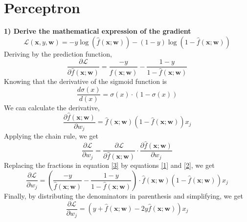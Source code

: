 \documentclass[acmconf,nonacm=true]{acmart}
\begin{document}
\section{Perceptron}
\textbf{1) Derive the mathematical expression of the gradient}
$$
\mathcal{L}(\mathbf{x}, y, \mathbf{w})=-y \log (\hat{f}(\mathbf{x} ; \mathbf{w}))-(1-y) \log (1-\hat{f}(\mathbf{x} ; \mathbf{w}))
$$
Deriving by the prediction function,
\begin{equation*} \label{1}
    \frac{\partial \mathcal{L}}{\partial \hat{f}(\mathbf{x} ; \mathbf{w})}=\frac{-y}{\hat{f}(\mathbf{x} ; \mathbf{w})}-\frac{1-y}{1-\hat{f}(\mathbf{x} ; \mathbf{w})} \tag{1}
\end{equation*}
Knowing that the derivative of the sigmoid function is
\begin{equation*}
\frac{d\sigma (x)}{d(x)} = \sigma (x)\cdot (1-\sigma(x))
\end{equation*}
We can calculate the derivative,
\begin{equation} \label{2}
\frac{\partial \hat{f}(\mathbf{x} ; \mathbf{w})}{\partial w_j}=\hat{f}(\mathbf{x} ; \mathbf{w})(1-\hat{f}(\mathbf{x} ; \mathbf{w})) x_j \tag{2}
\end{equation}
Applying the chain rule, we get
\begin{equation*} \label{3}
\frac{\partial \mathcal{L}}{\partial w_j}=\frac{\partial \mathcal{L}}{\partial \hat{f}(\mathbf{x} ; \mathbf{w})} \cdot \frac{\partial \hat{f}(\mathbf{x} ;\mathbf{w})}{\partial w_{j}} \tag{3}
\end{equation*}
Replacing the fractions in equation \ref{3} by equations \ref{1} and \ref{2}, we get
\begin{equation*}
\frac{\partial \mathcal{L}}{\partial w_j}=\left(\frac{-y}{\hat{f}(\mathbf{x} ; \mathbf{w})}-\frac{1-y}{1-\hat{f}(\mathbf{x} ; \mathbf{w})}\right) \cdot \hat{f}(\mathbf{x} ; \mathbf{w})(1-\hat{f}(\mathbf{x} ; \mathbf{w})) x_j
\end{equation*}
Finally, by distributing the denominators in parenthesis and simplifying, we get
\begin{equation*}
\frac{\partial \mathcal{L}}{\partial w_j}=(y+\hat{f}(\mathbf{x} ; \mathbf{w})-2 y \hat{f}(\mathbf{x} ; \mathbf{w})) x_j
\end{equation*}
\end{document}
